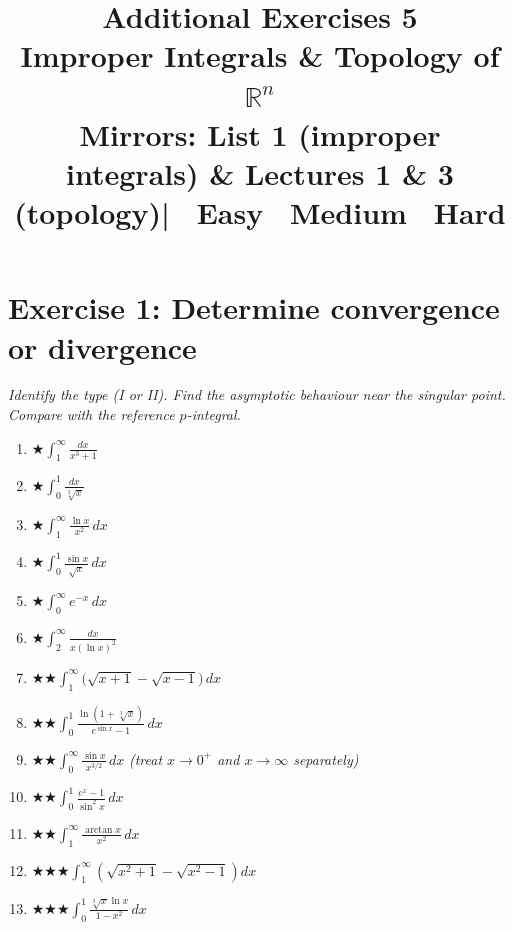 \documentclass[12pt,a4paper]{article}
\title{\textbf{Additional Exercises 5}\\
\large Improper Integrals \& Topology of $\mathbb{R}^n$\\[4pt]
\normalsize Mirrors: List 1 (improper integrals) \& Lectures 1 \& 3 (topology)\quad|\quad
\easy\ Easy \quad \medium\ Medium \quad \hard\ Hard}
\date{}
\newcommand{\easy}{{\color{green!60!black}$\bigstar$}}
\newcommand{\medium}{{\color{orange}$\bigstar\bigstar$}}
\newcommand{\hard}{{\color{red}$\bigstar\bigstar\bigstar$}}
\begin{document}
\maketitle
\thispagestyle{empty}

\section*{Exercise 1: Determine convergence or divergence}

\emph{Identify the type (I or II). Find the asymptotic behaviour near the singular point.
Compare with the reference $p$-integral.}

\begin{enumerate}[leftmargin=*, label=(\alph*)]

\item \easy\quad $\displaystyle\int_1^{\infty}\frac{dx}{x^3+1}$

\item \easy\quad $\displaystyle\int_0^{1}\frac{dx}{\sqrt[3]{x}}$

\item \easy\quad $\displaystyle\int_1^{\infty}\frac{\ln x}{x^2}\,dx$

\item \easy\quad $\displaystyle\int_0^{1}\frac{\sin x}{\sqrt{x}}\,dx$

\item \easy\quad $\displaystyle\int_0^{\infty} e^{-x}\,dx$

\item \easy\quad $\displaystyle\int_2^{\infty}\frac{dx}{x(\ln x)^2}$

\item \medium\quad $\displaystyle\int_1^{\infty}\!\bigl(\sqrt{x+1}-\sqrt{x-1}\bigr)\,dx$

\item \medium\quad $\displaystyle\int_0^{1}\frac{\ln(1+\sqrt[3]{x})}{e^{\sin x}-1}\,dx$

\item \medium\quad $\displaystyle\int_0^{\infty}\frac{\sin x}{x^{3/2}}\,dx$
\quad\emph{(treat $x\to 0^+$ and $x\to\infty$ separately)}

\item \medium\quad $\displaystyle\int_0^{1}\frac{e^x - 1}{\sin^2 x}\,dx$

\item \medium\quad $\displaystyle\int_1^{\infty}\frac{\arctan x}{x^2}\,dx$

\item \hard\quad $\displaystyle\int_1^{\infty}\!\left(\sqrt{x^2+1}-\sqrt{x^2-1}\right)dx$

\item \hard\quad $\displaystyle\int_0^{1}\frac{\sqrt[3]{x}\ln x}{1-x^2}\,dx$

\end{enumerate}
\end{document}
